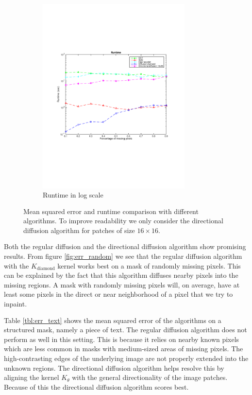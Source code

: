 \begin{figure}
\begin{subfigure}[b]{0.49\textwidth}
		\includegraphics[clip, trim=2cm 7cm 2cm 6cm, width=0.85\textwidth]{figures/runtime_vector}
		\caption{Runtime in log scale}
		\label{fig:runtime}
	\end{subfigure}
	
	\caption{Mean squared error and runtime comparison with different algorithms. To improve readability we only consider the directional diffusion algorithm for patches of size $16 \times 16$.}
	\label{fig:rmd_results}
\end{figure}


Both the regular diffusion and the directional diffusion algorithm show promising results. From figure \ref{fig:err_random} we see that the regular diffusion algorithm with the $K_{\text{diamond}}$ kernel works best on a mask of randomly missing pixels. This can be explained by the fact that this algorithm diffuses nearby pixels into the missing regions. A mask with randomly missing pixels will, on average, have at least some pixels in the direct or near neighborhood of a pixel that we try to inpaint.

Table \ref{tbl:err_text} shows the mean squared error of the algorithms on a structured mask, namely a piece of text. The regular diffusion algorithm does not perform as well in this setting. This is because it relies on nearby known pixels which are less common in masks with medium-sized areas of missing pixels. The high-contrasting edges of the underlying image are not properly extended into the unknown regions. The directional diffusion algorithm helps resolve this by aligning the kernel  $K_{\theta}$ with the general directionality of the image patches. Because of this the directional diffusion algorithm scores best.

